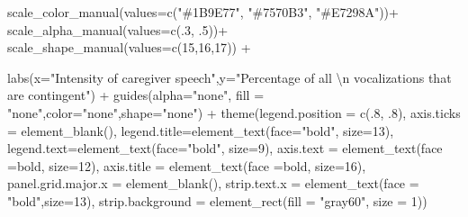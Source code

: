 \documentclass[
]{article}
\newenvironment{Shaded}{\begin{snugshade}}{\end{snugshade}}
\newcommand{\AttributeTok}[1]{\textcolor[rgb]{0.77,0.63,0.00}{#1}}
\newcommand{\DecValTok}[1]{\textcolor[rgb]{0.00,0.00,0.81}{#1}}
\newcommand{\FunctionTok}[1]{\textcolor[rgb]{0.00,0.00,0.00}{#1}}
\newcommand{\NormalTok}[1]{#1}
\newcommand{\SpecialCharTok}[1]{\textcolor[rgb]{0.00,0.00,0.00}{#1}}
\newcommand{\StringTok}[1]{\textcolor[rgb]{0.31,0.60,0.02}{#1}}
\begin{document}
\begin{Shaded}
\begin{Highlighting}[]
   \FunctionTok{scale\_color\_manual}\NormalTok{(}\AttributeTok{values=}\FunctionTok{c}\NormalTok{(}\StringTok{"\#1B9E77"}\NormalTok{, }\StringTok{"\#7570B3"}\NormalTok{, }\StringTok{"\#E7298A"}\NormalTok{))}\SpecialCharTok{+}
     \FunctionTok{scale\_alpha\_manual}\NormalTok{(}\AttributeTok{values=}\FunctionTok{c}\NormalTok{(.}\DecValTok{3}\NormalTok{, .}\DecValTok{5}\NormalTok{))}\SpecialCharTok{+}
  \FunctionTok{scale\_shape\_manual}\NormalTok{(}\AttributeTok{values=}\FunctionTok{c}\NormalTok{(}\DecValTok{15}\NormalTok{,}\DecValTok{16}\NormalTok{,}\DecValTok{17}\NormalTok{)) }\SpecialCharTok{+}

  \FunctionTok{labs}\NormalTok{(}\AttributeTok{x=}\StringTok{"Intensity of caregiver speech"}\NormalTok{,}\AttributeTok{y=}\StringTok{"Percentage of all }\SpecialCharTok{\textbackslash{}n}\StringTok{ vocalizations that are contingent"}\NormalTok{) }\SpecialCharTok{+}
  \FunctionTok{guides}\NormalTok{(}\AttributeTok{alpha=}\StringTok{"none"}\NormalTok{, }\AttributeTok{fill =} \StringTok{"none"}\NormalTok{,}\AttributeTok{color=}\StringTok{"none"}\NormalTok{,}\AttributeTok{shape=}\StringTok{"none"}\NormalTok{) }\SpecialCharTok{+}
  \FunctionTok{theme}\NormalTok{(}\AttributeTok{legend.position =} \FunctionTok{c}\NormalTok{(.}\DecValTok{8}\NormalTok{, .}\DecValTok{8}\NormalTok{),}
        \AttributeTok{axis.ticks =} \FunctionTok{element\_blank}\NormalTok{(),}
        \AttributeTok{legend.title=}\FunctionTok{element\_text}\NormalTok{(}\AttributeTok{face=}\StringTok{"bold"}\NormalTok{, }\AttributeTok{size=}\DecValTok{13}\NormalTok{),}
        \AttributeTok{legend.text=}\FunctionTok{element\_text}\NormalTok{(}\AttributeTok{face=}\StringTok{"bold"}\NormalTok{, }\AttributeTok{size=}\DecValTok{9}\NormalTok{),}
        \AttributeTok{axis.text =} \FunctionTok{element\_text}\NormalTok{(}\AttributeTok{face =}\StringTok{\textquotesingle{}bold\textquotesingle{}}\NormalTok{, }\AttributeTok{size=}\DecValTok{12}\NormalTok{),}
        \AttributeTok{axis.title =} \FunctionTok{element\_text}\NormalTok{(}\AttributeTok{face =}\StringTok{\textquotesingle{}bold\textquotesingle{}}\NormalTok{, }\AttributeTok{size=}\DecValTok{16}\NormalTok{),}
        \AttributeTok{panel.grid.major.x =} \FunctionTok{element\_blank}\NormalTok{(),}
        \AttributeTok{strip.text.x =} \FunctionTok{element\_text}\NormalTok{(}\AttributeTok{face =} \StringTok{"bold"}\NormalTok{,}\AttributeTok{size=}\DecValTok{13}\NormalTok{),}
        \AttributeTok{strip.background =} \FunctionTok{element\_rect}\NormalTok{(}\AttributeTok{fill =} \StringTok{"gray60"}\NormalTok{, }\AttributeTok{size =} \DecValTok{1}\NormalTok{)) }
\end{Highlighting}
\end{Shaded}
\end{document}
